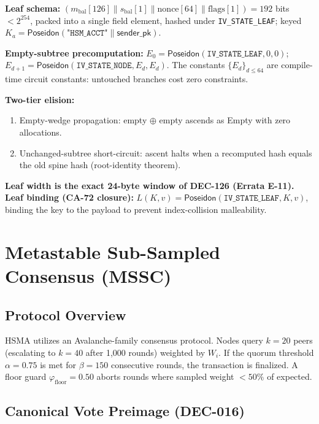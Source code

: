 \documentclass[11pt, a4paper]{article}
\begin{document}
\textbf{Leaf schema:} $(m_{\text{bal}}[126] \| s_{\text{bal}}[1] \| \text{nonce}[64] \| \text{flags}[1]) = 192$ bits $< 2^{254}$, packed into a single field element, hashed under \texttt{IV\_STATE\_LEAF}; keyed $K_a = \textsf{Poseidon}(\texttt{"HSM\_ACCT"} \| \textsf{sender\_pk})$.

\textbf{Empty-subtree precomputation:} $E_0 = \textsf{Poseidon}(\texttt{IV\_STATE\_LEAF}, 0, 0)$; $E_{d+1} = \textsf{Poseidon}(\texttt{IV\_STATE\_NODE}, E_d, E_d)$. The constants $\{E_d\}_{d \le 64}$ are compile-time circuit constants: untouched branches cost zero constraints.

\textbf{Two-tier elision:}
\begin{enumerate}
    \item Empty-wedge propagation: empty $\oplus$ empty ascends as Empty with zero allocations.
    \item Unchanged-subtree short-circuit: ascent halts when a recomputed hash equals the old spine hash (root-identity theorem).
\end{enumerate}

\textbf{Leaf width is the exact 24-byte window of DEC-126 (Errata E-11). Leaf binding (CA-72 closure):} $L(K, v) = \textsf{Poseidon}(\texttt{IV\_STATE\_LEAF}, K, v)$, binding the key to the payload to prevent index-collision malleability.

\section{Metastable Sub-Sampled Consensus (MSSC)}

\subsection{Protocol Overview}

HSMA utilizes an Avalanche-family consensus protocol. Nodes query $k = 20$ peers (escalating to $k = 40$ after 1,000 rounds) weighted by $W_i$. If the quorum threshold $\alpha = 0.75$ is met for $\beta = 150$ consecutive rounds, the transaction is finalized. A floor guard $\varphi_{\text{floor}} = 0.50$ aborts rounds where sampled weight $< 50\%$ of expected.

\subsection{Canonical Vote Preimage (DEC-016)}
\end{document}
